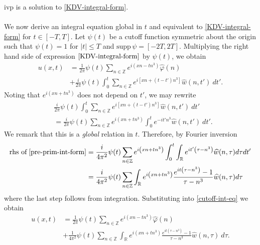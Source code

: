\documentclass[12pt,reqno]{amsart}
\numberwithin{equation}{section}  %
\numberwithin{figure}{section}
\newcommand{\rr}{\mathbb{R}}
\newcommand{\zz}{\mathbb{Z}}
\newcommand{\wh}{\widehat}
\newcommand{\vp}{\varphi}
\theoremstyle{plain}
\theoremstyle{definition}
\theoremstyle{remark}
\begin{document}
ivp is a solution to \eqref{KDV-integral-form}. 
\\
\\
%
%
We now derive an integral 
equation global in $t$ and equivalent to \eqref{KDV-integral-form} for $t 
\in [-T, T]$. Let $\psi(t)$ be a cutoff function symmetric about the 
origin such that $\psi(t) = 1$ for $|t| \le T$ and $\text{supp} \, \psi 
= [-2T, 2T ]$. Multiplying the right hand side of expression
$\eqref{KDV-integral-form}$ by $\psi(t)$, we obtain
%
%
\begin{equation}
	\begin{split}
		\label{cutoff-int-eq}
		u(x, t)
		& = \frac{1}{2 \pi} \psi(t) \sum_{n \in \zz} e^{i(xn - t n^3)} \widehat{\vp}(n) 
		\\
		& + \frac{i }{2 \pi} \psi(t) \int_0^t \sum_{n \in \zz} 
		e^{i\left[ xn + (t - t')n^3 \right]} \wh{w}(n, t') \ dt'.
	\end{split}
\end{equation}
%
%
Noting that $e^{i\left( xn + tn^3 \right)}$ 
does not depend on $t'$, we may rewrite
%
%
\begin{equation}
	\label{pre-prim-int-form}
	\begin{split}
		& \frac{i }{2 \pi} \psi(t) \int_0^t \sum_{n \in \zz} 
		e^{i\left[ xn + (t - t') n^3 \right]} \wh{w}(n, t') \ dt'
		\\
		& = \frac{i}{2 \pi} \psi(t) \sum_{n \in \zz} e^{i\left( xn + t 
		 n^3 
		\right)} \int_0^t e^{- it'n^3} \wh{w}(n, t') \ dt'.
	\end{split}
\end{equation}
We remark that this is a \emph{global} relation in $t$. Therefore, by Fourier 
inversion
%
%
%
%
%
%
%
\begin{equation*}
	\begin{split}
		\text{rhs of} \; \eqref{pre-prim-int-form}
		& = \frac{i}{4 \pi^2} \psi (t) \sum_{n \in \zz} e^{i\left( xn + t 
		 n^3
		\right)} \int_0^t \int_\rr e^{it'\left( \tau - n^3 \right) }
		\wh{w}(n, \tau) d \tau dt'
		\\
		& = \frac{i}{4 \pi^2} \psi(t) \sum_{n \in \zz} \int_\rr 
		e^{i\left( xn + tn^3 \right)} \frac{e^{it\left( \tau - n^3 
		\right)}-1}{\tau - n^3} \wh{w}(n, \tau) d \tau
	\end{split}
\end{equation*}
%
%
where the last step follows from integration. Substituting
into \eqref{cutoff-int-eq} we obtain
%
%
\begin{equation}
	\begin{split}
		\label{cutoff-int-eq-2}
		u(x, t)
		& = \frac{1}{2 \pi} \psi(t) \sum_{n \in \zz} e^{i(xn - tn^3)} \widehat{\vp}(n) 
		\\
		& + \frac{1}{4 \pi^2} \psi(t) \sum_{n \in \zz} \int_\rr
		e^{i(xn + t n^3)} \frac{e^{it(\tau - n^3)}- 1}{\tau - n^3} 
		\wh{w}(n, \tau) \ d \tau.
	\end{split}
\end{equation}
\end{document}
